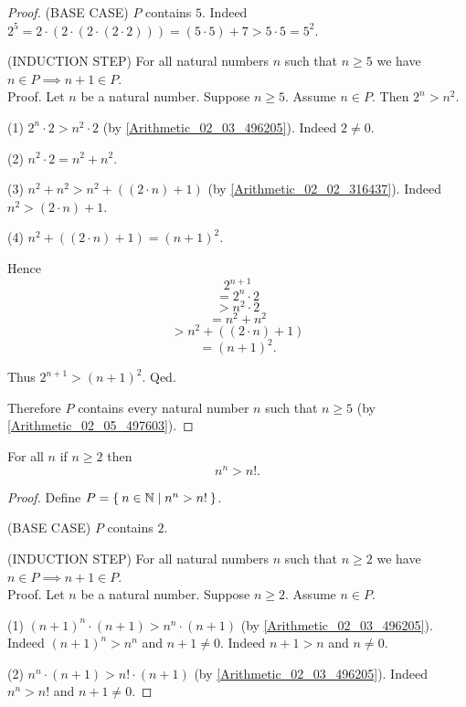 \documentclass[../../arithmetic.ftl.tex]{subfiles}
\begin{document}
\begin{forthel}
\begin{proof}
      (BASE CASE) $P$ contains $5$.
      Indeed $2^{5} = 2 \cdot (2 \cdot (2 \cdot (2 \cdot 2))) = (5 \cdot 5) + 7 > 5 \cdot 5 = 5^{2}$.

      (INDUCTION STEP) For all natural numbers $n$ such that $n \geq 5$ we have $n \in P \implies n + 1 \in P$. \\
      Proof.
        Let $n$ be a natural number.
        Suppose $n \geq 5$.
        Assume $n \in P$.
        Then $2^{n} > n^{2}$.

        (1) $2^{n} \cdot 2 > n^{2} \cdot 2$ (by \ref{Arithmetic_02_03_496205}).
        Indeed $2 \neq 0$.

        (2) $n^{2} \cdot 2 = n^{2} + n^{2}$.

        (3) $n^{2} + n^{2} > n^{2} + ((2 \cdot n) + 1)$ (by \ref{Arithmetic_02_02_316437}).
        Indeed $n^{2} > (2 \cdot n) + 1$.

        (4) $n^{2} + ((2 \cdot n) + 1) = (n + 1)^{2}$.

        Hence
        \[   2^{n + 1} \]
        \[ = 2^{n} \cdot 2 \]
        \[ > n^{2} \cdot 2 \]
        \[ = n^{2} + n^{2} \]
        \[ > n^{2} + ((2 \cdot n) + 1) \]
        \[ = (n + 1)^{2}. \]

        Thus $2^{n + 1} > (n + 1)^{2}$.
      Qed.

      Therefore $P$ contains every natural number $n$ such that $n \geq 5$ (by \ref{Arithmetic_02_05_497603}).
    \end{proof}


    \begin{proposition}\label{Arithmetic_02_06_527159}
      For all $n$ if $n \geq 2$ then \[ n^{n} > n!. \]
    \end{proposition}
    \begin{proof}
      Define $P = \Set{n \in \mathbb{N} | n^{n} > n!}$.

      (BASE CASE) $P$ contains $2$.

      (INDUCTION STEP) For all natural numbers $n$ such that $n \geq 2$ we have $n \in P \implies n + 1 \in P$. \\
      Proof.
        Let $n$ be a natural number.
        Suppose $n \geq 2$.
        Assume $n \in P$.

        (1) $(n + 1)^{n} \cdot (n + 1) > n^{n} \cdot (n + 1)$ (by \ref{Arithmetic_02_03_496205}).
        Indeed $(n + 1)^{n} > n^{n}$ and $n + 1 \neq 0$.
        Indeed $n + 1 > n$ and $n \neq 0$.

        (2) $n^{n} \cdot (n + 1) > n! \cdot (n + 1)$ (by \ref{Arithmetic_02_03_496205}).
        Indeed $n^{n} > n!$ and $n + 1 \neq 0$.


\end{proof}
\end{forthel}
\end{document}
